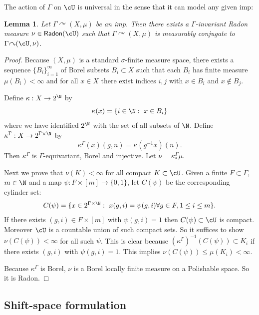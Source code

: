 \documentclass[12pt]{article}
\theoremstyle{plain}
\newtheorem{lem}[thm]{Lemma}
\theoremstyle{definition}
\theoremstyle{remark}
\newcommand{\G}{\Gamma}
\renewcommand\a{\alpha}
\newcommand\s{\sigma}
\newcommand\Prob{\operatorname{Prob}}
\newcommand\Radon{\mathsf{Radon}}
\def\cc{{\curvearrowright}}
\begin{document}
The action of $\G$ on $\cU$ is universal in the sense that it can model any given imp:
\begin{lem}\label{L:finiteness}
    Let $\G \cc (X,\mu)$ be an imp. Then there exists a $\G$-invariant Radon measure $\nu \in \Radon(\cU)$ such that $\G \cc (X,\mu)$ is measurably conjugate to $\G \cc (\cU, \nu)$.
\end{lem}

\begin{proof}
    Because $(X,\mu)$ is a standard $\s$-finite measure space, there exists a sequence $\{B_i\}_{i=1}^\infty$ of Borel subsets $B_i \subset X$ such that each $B_i$ has finite measure $\mu(B_i)<\infty$ and for all $x\in X$ there exist indices $i,j$ with $x \in B_i$ and $x\notin B_j$.
    

Define $\kappa:X \to 2^\N$ by 
$$\kappa(x)=\{i \in \N:~ x\in B_i\}$$
where we have identified $2^\N$ with the set of all subsets of $\N$. Define $\kappa^\G:X \to 2^{\G\times \N}$ by 
$$\kappa^\G(x)(g,n) = \kappa(g^{-1}x)(n).$$
Then $\kappa^\G$ is $\G$-equivariant, Borel and injective. Let $\nu=\kappa^\G_*\mu$. 

Next we prove that $\nu(K)<\infty$ for all compact $K \subset \cU$. Given a finite $F \subset \G$, $m\in \N$ and a map $\psi:F \times [m] \to \{0,1\}$, let $C(\psi)$ be the corresponding cylinder set:
$$C(\psi) = \{x\in 2^{\G\times \N}:~ x(g,i)=\psi(g,i) \forall g\in F, 1\le i \le m\}.$$
If there exists $(g,i)\in F\times [m]$ with $\psi(g,i)=1$ then $C(\psi)\subset \cU$ is compact. Moreover $\cU$ is a countable union of such compact sets. So it suffices to show $\nu(C(\psi))<\infty$ for all such $\psi$. This is clear because $(\kappa^\G)^{-1}(C(\psi)) \subset K_i$ if there exists $(g,i)$ with $\psi(g,i)=1$. This implies $\nu(C(\psi))\le \mu(K_i)<\infty$.

Because $\kappa^\G$ is Borel, $\nu$ is a Borel locally finite measure on a Polishable space. So it is Radon. 
\end{proof}




  

\subsection{Shift-space formulation}
\end{document}
